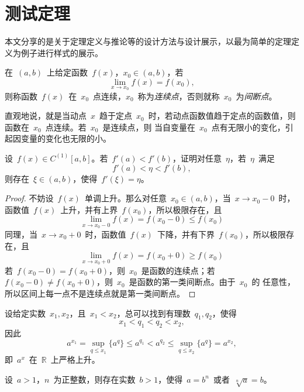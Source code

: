 \documentclass[a4paper,10pt]{ctexart}
\theoremstyle{definition}
\begin{document}
\section{测试定理}
本文分享的是关于定理定义与推论等的设计方法与设计展示，以最为简单的定理定义为例子进行样式的展示。
\begin{defi}在~$(a,b)$~上给定函数~$f(x)$，$x_0\in(a,b)$，若
\begin{equation}\label{eq:sec3.1-1}
\lim_{x\to x_0}f(x)=f(x_0),
\end{equation}
则称函数~$f(x)$~在~$x_0$~点连续，$x_0$~称为\emph{连续点}，否则就称~$x_0$~为\emph{间断点}。
\end{defi}
直观地说，就是当动点~$x$~趋于定点~$x_0$~时，若动点函数值趋于定点的函数值，则函数在~$x_0$~点连续。若~$x_0$~是连续点，则
当自变量在~$x_0$~点有无限小的变化，引起因变量的变化也无限的小。
\begin{theo}[Darboux定理]
\label{theo:riemann}
设~$f(x)\in C^{(1)}[a, b]$。若~$f'(a)<f'(b)$，证明对任意~$\eta$，若~$\eta$~满足
\begin{equation}
 f'(a)<\eta<f'(b),
\end{equation}
则存在~$\xi\in(a, b)$，使得~$f'(\xi)=\eta$。
\end{theo}
\begin{proof}
不妨设~$f(x)$~单调上升。那么对任意~$x_0\in(a,b)$，当~$x\to x_0-0$~时，函数值~$f(x)$~上升，并有上界~$f(x_0)$，所以极限存在，且
\[
  \lim_{x\to x_0-0}f(x)=f(x_0-0)\leq f(x_0)
\]
同理，当~$x\to x_0+0$~时，函数值~$f(x)$~下降，并有下界~$f(x_0)$，所以极限存在，且
\[
  \lim_{x\to x_0+0}f(x)=f(x_0+0)\geq f(x_0)
\]
若~$f(x_0-0)=f(x_0+0)$，则~$x_0$~是函数的连续点；若~$f(x_0-0)\neq f(x_0+0)$，则~$x_0$~是函数的第一类间断点。由于~$x_0$~的
任意性，所以区间上每一点不是连续点就是第一类间断点。
\end{proof}
\begin{prop}
设给定实数~$x_1,x_2$，且~$x_1<x_2$，总可以找到有理数~$q_1,q_2$，使得
\[
  x_1<q_1<q_2<x_2,
\]
因此
\[
  a^{x_1}=\sup_{q\leq x_1}\{a^q\}\leq a^{q_1}<a^{q_2}\leq\sup_{q\leq x_2}\{a^q\}=a^{x_2},
\]
即~$a^x$~在~$\mathbb{R}$~上严格上升。
\end{prop}

\begin{lem}\label{lem:sec3.4-1}
设~$a>1$，$n$~为正整数，则存在实数~$b>1$，使得~$a=b^n$~或者~$\sqrt[n]a=b$。
\end{lem}
\end{document}
